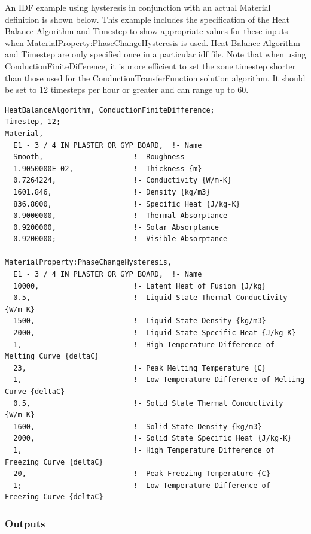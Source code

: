 An IDF example using hysteresis in conjunction with an actual Material definition is shown below.  This example includes the specification of the Heat Balance Algorithm and Timestep to show appropriate values for these inputs when MaterialProperty:PhaseChangeHysteresis is used.  Heat Balance Algorithm and Timestep are only specified once in a particular idf file.  Note that when using ConductionFiniteDifference, it is more efficient to set the zone timestep shorter than those used for the ConductionTransferFunction solution algorithm.  It should be set to 12 timesteps per hour or greater and can range up to 60.

\begin{lstlisting}
HeatBalanceAlgorithm, ConductionFiniteDifference;
Timestep, 12;
Material,
  E1 - 3 / 4 IN PLASTER OR GYP BOARD,  !- Name
  Smooth,                     !- Roughness
  1.9050000E-02,              !- Thickness {m}
  0.7264224,                  !- Conductivity {W/m-K}
  1601.846,                   !- Density {kg/m3}
  836.8000,                   !- Specific Heat {J/kg-K}
  0.9000000,                  !- Thermal Absorptance
  0.9200000,                  !- Solar Absorptance
  0.9200000;                  !- Visible Absorptance

MaterialProperty:PhaseChangeHysteresis,
  E1 - 3 / 4 IN PLASTER OR GYP BOARD,  !- Name
  10000,                      !- Latent Heat of Fusion {J/kg}
  0.5,                        !- Liquid State Thermal Conductivity {W/m-K}
  1500,                       !- Liquid State Density {kg/m3}
  2000,                       !- Liquid State Specific Heat {J/kg-K}
  1,                          !- High Temperature Difference of Melting Curve {deltaC}
  23,                         !- Peak Melting Temperature {C}
  1,                          !- Low Temperature Difference of Melting Curve {deltaC}
  0.5,                        !- Solid State Thermal Conductivity {W/m-K}
  1600,                       !- Solid State Density {kg/m3}
  2000,                       !- Solid State Specific Heat {J/kg-K}
  1,                          !- High Temperature Difference of Freezing Curve {deltaC}
  20,                         !- Peak Freezing Temperature {C}
  1;                          !- Low Temperature Difference of Freezing Curve {deltaC}
\end{lstlisting}

\subsubsection{Outputs}\label{materialpropertyphasechangehysteresis-outputs}

